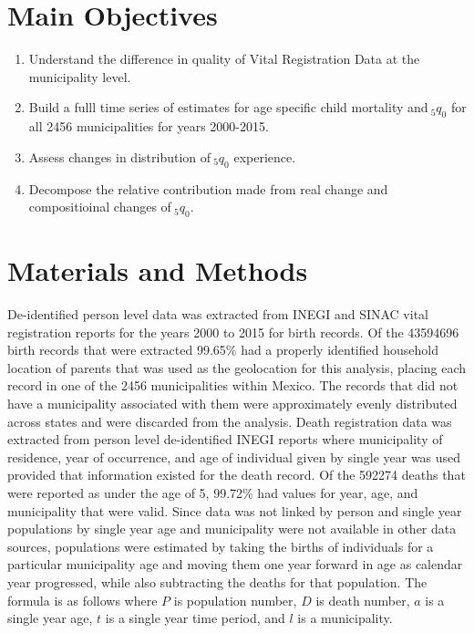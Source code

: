 \documentclass[a0,portrait]{a0poster}
\begin{document}
\begin{multicols}{2}

\color{black} %

\section*{Main Objectives}

\begin{enumerate}
\item Understand the difference in quality of Vital Registration Data at the municipality level.
\item Build a fulll time series of estimates for age specific child mortality and$~_{5}q_{0}$ for all 2456 municipalities for years 2000-2015.
\item Assess changes in distribution of$~_{5}q_{0}$ experience.
\item Decompose the relative contribution made from real change and compositioinal changes of$~_{5}q_{0}$.
\end{enumerate}


\section*{Materials and Methods}

De-identified person level data was extracted from INEGI and SINAC vital registration reports for the years 2000 to 2015 for birth records. Of the 43594696 birth records that were extracted 99.65\% had a properly identified household location of parents that was used as the geolocation for this analysis, placing each record in one of the 2456 municipalities within Mexico. The records that did not have a municipality associated with them were approximately evenly distributed across states and were discarded from the analysis. Death registration data was extracted from person level de-identified INEGI reports where municipality of residence, year of occurrence, and age of individual given by single year was used provided that information existed for the death record. Of the 592274 deaths that were reported as under the age of 5, 99.72\% had values for year, age, and municipality that were valid. Since data was not linked by person and single year populations by single year age and municipality were not available in other data sources, populations were estimated by taking the births of individuals for a particular municipality age and moving them one year forward in age as calendar year progressed, while also subtracting the deaths for that population. The formula is as follows where $P$ is population number, $D$ is death number, $a$ is a single year age, $t$ is a single year time period, and $l$ is a municipality.


\end{multicols}
\end{document}
